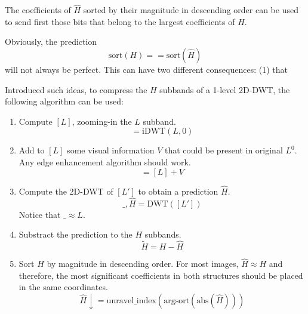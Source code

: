 
The coefficients of $\hat{H}$ sorted by their magnitude in descending
order can be used to send first those bits that belong to the largest
coefficients of $H$.

Obviously, the prediction
\begin{equation}
  \text{sort}(H)==\text{sort}(\hat{H})
\end{equation}
will not always be perfect. This can have two different consequences: (1) that 

Introduced such ideas, to compress the $H$ subbands of a 1-level
2D-DWT, the following algorithm can be used:

\begin{enumerate}

\item Compute $[L]$, zooming-in the $L$ subband.
  \begin{equation}
    [L] = \text{iDWT}(L, 0)
  \end{equation}
  
\item Add to $[L]$ some visual information $V$ that could be present
  in original $L^0$. Any edge enhancement algorithm should work.
  \begin{equation}
    [L'] = [L] + V
  \end{equation}

\item Compute the 2D-DWT of $[L']$ to obtain a prediction $\hat{H}$.
  \begin{equation}
    \_, \hat{H} = \text{DWT}([L'])
  \end{equation}
  Notice that $\_\approx L$.

\item Substract the prediction to the $H$ subbands.
  \begin{equation}
    \tilde{H} = H-\hat{H}
  \end{equation}

\item Sort $\hat{H}$ by magnitude in descending order. For most
  images, $\hat{H}\approx H$ and therefore, the most significant
  coefficients in both structures should be placed in the same
  coordinates.
  \begin{equation}
    \hat{H}\downarrow = \text{unravel\_index}(\text{argsort}(\text{abs}(\hat{H})))
  \end{equation}


\end{enumerate}
